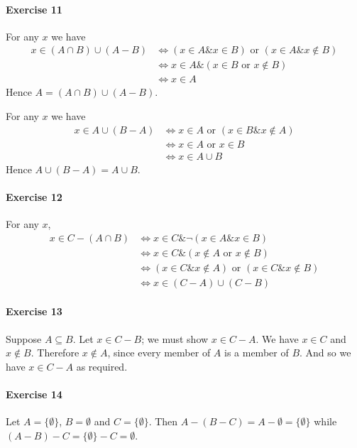 \documentclass{report}
\begin{document}
    \paragraph{Exercise 11}

    For any $x$ we have
    \begin{align*}
        x \in (A \cap B) \cup (A - B) & \Leftrightarrow (x \in A \& x \in B) \text{ or } (x \in A \&
        x \notin B) \\
        & \Leftrightarrow x \in A \& (x \in B \text{ or } x \notin B) \\
        & \Leftrightarrow x \in A
    \end{align*}
    Hence $A = (A \cap B) \cup (A - B)$.

    For any $x$ we have
    \begin{align*}
        x \in A \cup (B - A) & \Leftrightarrow x \in A \text{ or } (x \in B \& x \notin A) \\
        & \Leftrightarrow x \in A \text{ or } x \in B \\
        & \Leftrightarrow x \in A \cup B
    \end{align*}
    Hence $A \cup (B - A) = A \cup B$.

    \paragraph{Exercise 12}
    For any $x$,
    \begin{align*}
        x \in C - (A \cap B) & \Leftrightarrow x \in C \& \neg (x \in A \& x \in B) \\
        & \Leftrightarrow x \in C \& (x \notin A \text{ or } x \notin B) \\
        & \Leftrightarrow (x \in C \& x \notin A) \text{ or } (x \in C \& x \notin B) \\
        & \Leftrightarrow x \in (C - A) \cup (C - B)
    \end{align*}

    \paragraph{Exercise 13}
    Suppose $A \subseteq B$. Let $x \in C - B$; we must show $x \in C - A$. We have $x \in C$ and $x \notin B$. Therefore $x \notin A$,
    since every member of $A$ is a member of $B$. And so we have $x \in C - A$ as required.

    \paragraph{Exercise 14}
    Let $A = \{ \emptyset \}$, $B = \emptyset$ and $C = \{ \emptyset \}$. Then $A - (B - C) = A - \emptyset
    = \{ \emptyset \}$ while $(A - B) - C = \{ \emptyset \} - C = \emptyset$.
\end{document}
